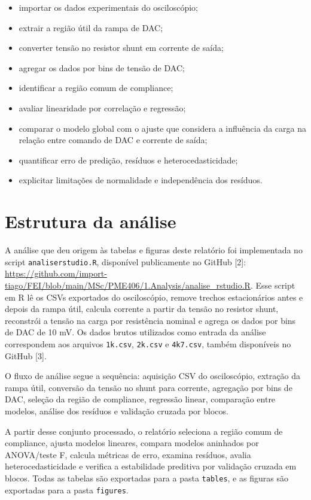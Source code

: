 \documentclass[
  brazilian,
]{article}
\providecommand{\tightlist}{%
  \setlength{\itemsep}{0pt}\setlength{\parskip}{0pt}}
\renewcommand{\_}{\oldunderscore\discretionary{}{}{}}
\begin{document}
\begin{itemize}
\tightlist
\item
  importar os dados experimentais do osciloscópio;
\item
  extrair a região útil da rampa de DAC;
\item
  converter tensão no resistor shunt em corrente de saída;
\item
  agregar os dados por bins de tensão de DAC;
\item
  identificar a região comum de compliance;
\item
  avaliar linearidade por correlação e regressão;
\item
  comparar o modelo global com o ajuste que considera a influência da
  carga na relação entre comando de DAC e corrente de saída;
\item
  quantificar erro de predição, resíduos e heterocedasticidade;
\item
  explicitar limitações de normalidade e independência dos resíduos.
\end{itemize}

\section{Estrutura da análise}\label{estrutura-da-anuxe1lise}

A análise que deu origem às tabelas e figuras deste relatório foi
implementada no script \texttt{analise\_rstudio.R}, disponível
publicamente no GitHub {[}2{]}:
\url{https://github.com/import-tiago/FEI/blob/main/MSc/PME406/1.Analysis/analise_rstudio.R}.
Esse script em R lê os CSVs exportados do osciloscópio, remove trechos
estacionários antes e depois da rampa útil, calcula corrente a partir da
tensão no resistor shunt, reconstrói a tensão na carga por resistência
nominal e agrega os dados por bins de DAC de 10 mV. Os dados brutos
utilizados como entrada da análise correspondem aos arquivos
\texttt{1k.csv}, \texttt{2k.csv} e \texttt{4k7.csv}, também disponíveis
no GitHub {[}3{]}.

O fluxo de análise segue a sequência: aquisição CSV do osciloscópio,
extração da rampa útil, conversão da tensão no shunt para corrente,
agregação por bins de DAC, seleção da região de compliance, regressão
linear, comparação entre modelos, análise dos resíduos e validação
cruzada por blocos.

A partir desse conjunto processado, o relatório seleciona a região comum
de compliance, ajusta modelos lineares, compara modelos aninhados por
ANOVA/teste F, calcula métricas de erro, examina resíduos, avalia
heterocedasticidade e verifica a estabilidade preditiva por validação
cruzada em blocos. Todas as tabelas são exportadas para a pasta
\texttt{tables}, e as figuras são exportadas para a pasta
\texttt{figures}.
\end{document}
